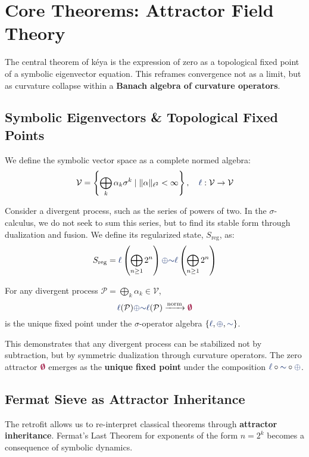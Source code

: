 \section{Core Theorems: Attractor Field Theory}

The central theorem of kéya is the expression of zero as a topological fixed point of a symbolic eigenvector equation. This reframes convergence not as a limit, but as curvature collapse within a \textbf{Banach algebra of curvature operators}.

\subsection{Symbolic Eigenvectors \& Topological Fixed Points}
We define the symbolic vector space as a complete normed algebra:
\[
\mathcal{V} = \left\{ \bigoplus_k \alpha_k \sigma^k  \mid  \| \alpha \|_{\ell^2} < \infty \right\}, \quad \lha : \mathcal{V} \to \mathcal{V}
\]

Consider a divergent process, such as the series of powers of two. In the $\sigma$-calculus, we do not seek to sum this series, but to find its stable form through dualization and fusion. We define its regularized state, $S_{\text{reg}}$, as:
\[
S_{\text{reg}} = \lha \left( \bigoplus_{n \geq 1} 2^{n} \right) \fuse \reflec \lha \left( \bigoplus_{n \geq 1} 2^{n} \right)
\]

\begin{theorem}
For any divergent process $\mathcal{P} = \bigoplus_k \alpha_k \in \mathcal{V}$,
\[ \lha(\mathcal{P}) \fuse \reflec \lha(\mathcal{P}) \xrightarrow{\text{norm}} \void \]
is the unique fixed point under the $\sigma$-operator algebra $\{\lha, \fuse, \reflec\}$.
\end{theorem}

This demonstrates that any divergent process can be stabilized not by subtraction, but by symmetric dualization through curvature operators. The zero attractor $\void$ emerges as the \textbf{unique fixed point} under the composition $\lha \circ \reflec \circ \fuse$.

\subsection{Fermat Sieve as Attractor Inheritance}
The retrofit allows us to re-interpret classical theorems through \textbf{attractor inheritance}. Fermat's Last Theorem for exponents of the form $n=2^k$ becomes a consequence of symbolic dynamics.

